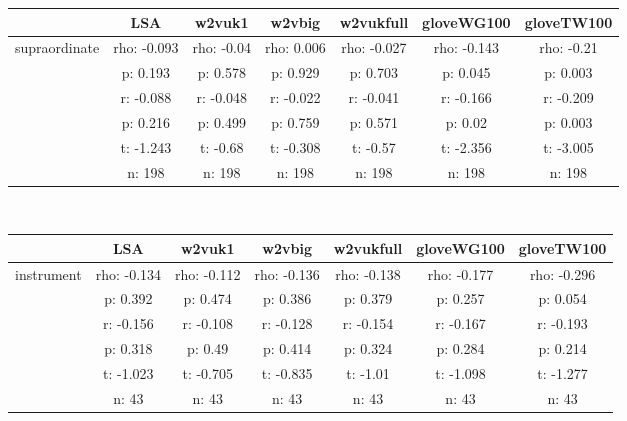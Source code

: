 \documentclass{article}
\begin{document}
\begin{tabular}{ccccccc|}\cline{2-7}
&\multicolumn{1}{|c}{LSA} & w2vuk1 & w2vbig & w2vukfull & gloveWG100 & gloveTW100 \\\hline
\multicolumn{1}{|c|}{\multirow{6}{*}{supraordinate}} & rho: -0.093 & rho: -0.04 & rho: 0.006 & rho: -0.027 & rho: -0.143 & rho: -0.21 \\
\multicolumn{1}{|c|}{} & p: 0.193 & p: 0.578 & p: 0.929 & p: 0.703 & p: 0.045 & p: 0.003 \\
\multicolumn{1}{|c|}{} & r: -0.088 & r: -0.048 & r: -0.022 & r: -0.041 & r: -0.166 & r: -0.209 \\
\multicolumn{1}{|c|}{} & p: 0.216 & p: 0.499 & p: 0.759 & p: 0.571 & p: 0.02 & p: 0.003 \\
\multicolumn{1}{|c|}{} & t: -1.243 & t: -0.68 & t: -0.308 & t: -0.57 & t: -2.356 & t: -3.005 \\
\multicolumn{1}{|c|}{} & n: 198 & n: 198 & n: 198 & n: 198 & n: 198 & n: 198 \\
\hline
\end{tabular}\\
\begin{tabular}{ccccccc|}\cline{2-7}
&\multicolumn{1}{|c}{LSA} & w2vuk1 & w2vbig & w2vukfull & gloveWG100 & gloveTW100 \\\hline
\multicolumn{1}{|c|}{\multirow{6}{*}{instrument}} & rho: -0.134 & rho: -0.112 & rho: -0.136 & rho: -0.138 & rho: -0.177 & rho: -0.296 \\
\multicolumn{1}{|c|}{} & p: 0.392 & p: 0.474 & p: 0.386 & p: 0.379 & p: 0.257 & p: 0.054 \\
\multicolumn{1}{|c|}{} & r: -0.156 & r: -0.108 & r: -0.128 & r: -0.154 & r: -0.167 & r: -0.193 \\
\multicolumn{1}{|c|}{} & p: 0.318 & p: 0.49 & p: 0.414 & p: 0.324 & p: 0.284 & p: 0.214 \\
\multicolumn{1}{|c|}{} & t: -1.023 & t: -0.705 & t: -0.835 & t: -1.01 & t: -1.098 & t: -1.277 \\
\multicolumn{1}{|c|}{} & n: 43 & n: 43 & n: 43 & n: 43 & n: 43 & n: 43 \\
\hline
\end{tabular}\\
\end{document}
